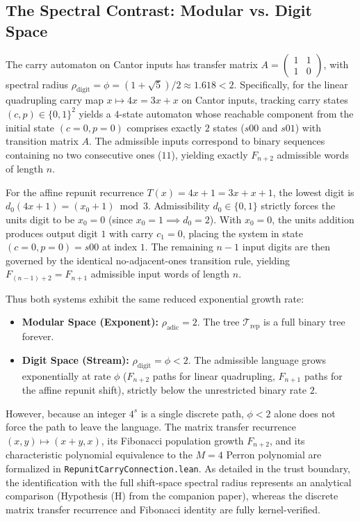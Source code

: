 \documentclass[11pt,reqno]{amsart}
\theoremstyle{plain}
\theoremstyle{definition}
\theoremstyle{remark}
\newcommand{\Trep}{\mathcal{T}_{\mathrm{rep}}}
\begin{document}
\subsection{The Spectral Contrast: Modular vs. Digit Space}
The carry automaton on Cantor inputs has transfer matrix $A = \begin{pmatrix} 1 & 1 \\ 1 & 0 \end{pmatrix}$, with spectral radius $\rho_{\mathrm{digit}} = \phi = (1+\sqrt{5})/2 \approx 1.618 < 2$. Specifically, for the linear quadrupling carry map $x \mapsto 4x = 3x + x$ on Cantor inputs, tracking carry states $(c, p) \in \{0, 1\}^2$ yields a $4$-state automaton whose reachable component from the initial state $(c=0, p=0)$ comprises exactly $2$ states ($s00$ and $s01$) with transition matrix $A$. The admissible inputs correspond to binary sequences containing no two consecutive ones ($11$), yielding exactly $F_{n+2}$ admissible words of length $n$.

For the affine repunit recurrence $T(x) = 4x + 1 = 3x + x + 1$, the lowest digit is $d_0(4x+1) = (x_0 + 1) \bmod 3$. Admissibility $d_0 \in \{0, 1\}$ strictly forces the units digit to be $x_0 = 0$ (since $x_0 = 1 \implies d_0 = 2$). With $x_0 = 0$, the units addition produces output digit $1$ with carry $c_1 = 0$, placing the system in state $(c=0, p=0) = s00$ at index $1$. The remaining $n-1$ input digits are then governed by the identical no-adjacent-ones transition rule, yielding $F_{(n-1)+2} = F_{n+1}$ admissible input words of length $n$. 

Thus both systems exhibit the same reduced exponential growth rate:
\begin{itemize}
    \item \textbf{Modular Space (Exponent):} $\rho_{\mathrm{adic}} = 2$. The tree $\Trep$ is a full binary tree forever.
    \item \textbf{Digit Space (Stream):} $\rho_{\mathrm{digit}} = \phi < 2$. The admissible language grows exponentially at rate $\phi$ ($F_{n+2}$ paths for linear quadrupling, $F_{n+1}$ paths for the affine repunit shift), strictly below the unrestricted binary rate $2$.
\end{itemize}
However, because an integer $4^s$ is a single discrete path, $\phi < 2$ alone does not force the path to leave the language. The matrix transfer recurrence $(x, y) \mapsto (x+y, x)$, its Fibonacci population growth $F_{n+2}$, and its characteristic polynomial equivalence to the $M=4$ Perron polynomial are formalized in \texttt{RepunitCarryConnection.lean}. As detailed in the trust boundary, the identification with the full shift-space spectral radius represents an analytical comparison (Hypothesis (H) from the companion paper), whereas the discrete matrix transfer recurrence and Fibonacci identity are fully kernel-verified.
\end{document}
